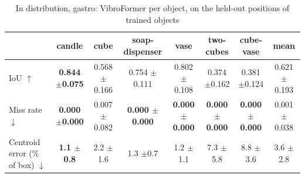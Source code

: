 \begin{table}
\caption{In distribution, gastro: VibroFormer per object, on the held-out positions of trained objects}
\label{tab:id_gastro}
\begin{tabular}{l!{\vrule width 1.2pt}cccccc!{\vrule width 1.2pt}c}
\toprule
 & candle & cube & soap-dispenser & vase & two-cubes & cube-vase & mean \\
\midrule
IoU $\uparrow$ & \bfseries 0.844 {\scriptsize $\pm$0.075} & 0.568 {\scriptsize $\pm$0.166} & 0.754 {\scriptsize $\pm$0.111} & 0.802 {\scriptsize $\pm$0.108} & 0.374 {\scriptsize $\pm$0.162} & 0.381 {\scriptsize $\pm$0.124} & 0.621 {\scriptsize $\pm$0.193} \\
Miss rate $\downarrow$ & \bfseries 0.000 {\scriptsize $\pm$0.000} & 0.007 {\scriptsize $\pm$0.082} & \bfseries 0.000 {\scriptsize $\pm$0.000} & \bfseries 0.000 {\scriptsize $\pm$0.000} & \bfseries 0.000 {\scriptsize $\pm$0.000} & \bfseries 0.000 {\scriptsize $\pm$0.000} & 0.001 {\scriptsize $\pm$0.038} \\
Centroid error (\% of box) $\downarrow$ & \bfseries 1.1 {\scriptsize $\pm$0.8} & 2.2 {\scriptsize $\pm$1.6} & 1.3 {\scriptsize $\pm$0.7} & 1.2 {\scriptsize $\pm$1.1} & 7.3 {\scriptsize $\pm$5.8} & 8.8 {\scriptsize $\pm$3.6} & 3.6 {\scriptsize $\pm$2.8} \\
\bottomrule
\end{tabular}
\end{table}
